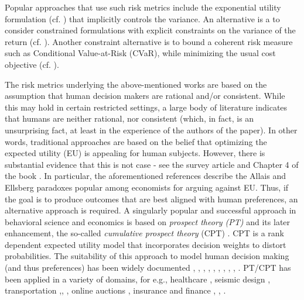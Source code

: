 Popular approaches that use such risk metrics include the exponential utility formulation 
(cf. \cite{borkar2010learning}) that implicitly controls the variance.
An alternative is a to consider constrained formulations 
with explicit constraints on the variance of the return (cf. \cite{tamar2012policy,Prashanth13AC}). 
Another constraint alternative is to bound a coherent risk measure such as Conditional Value-at-Risk (CVaR), 
while minimizing the usual cost objective (cf. \cite{borkar2010risk,prashanth2014policy}).  

The risk metrics underlying the above-mentioned works 
are based on the assumption that human decision makers are rational and/or consistent.
While this may hold in certain restricted settings, a large body of literature indicates that humans are neither rational,
nor consistent (which, in fact, is an unsurprising fact, at least in the experience of the authors of the paper).
In other words, traditional approaches are based on the belief that optimizing the expected utility (EU) is appealing for human subjects. However, there is substantial evidence that this is not case - see 
the survey article \cite{starmer2000developments} and Chapter 4 of the book \cite{quiggin2012generalized}. In particular, the aforementioned references describe the Allais and Ellsberg paradoxes popular among economists for arguing against EU. 
Thus, if the goal is to produce outcomes that are best aligned with human preferences,
an alternative approach is required.
A singularly popular and successful approach in behavioral science and economics
is based on \textit{prospect theory (PT)} \cite{kahneman1979prospect} 
and its later enhancement, the so-called \textit{cumulative prospect theory} (CPT) \cite{tversky1992advances}.
CPT is a rank dependent expected utility model \cite{quiggin2012generalized} that incorporates decision weights to distort probabilities. 
The suitability of this approach to model human decision making (and thus preferences) has been widely documented \cite{prelec1998probability}, \cite{wu1996curvature}, \cite{conlisk1989three}, \cite{camerer1989experimental}, \cite{camerer1992recent}, \cite{harless1992predictions}, \cite{sopher1993test}, \cite{camerer1994violations}, \cite{gonzalez1999shape}, \cite{abdellaoui2000parameter}.
PT/CPT has been applied in a variety of domains, for e.g., healthcare \cite{lenert1999associations},  seismic design \cite{goda2008application}, transportation \cite{gao2010adaptive},\cite{fujii2004drivers}, \cite{ramming2001network}, online auctions \cite{weinberg2005exploring}, insurance  \cite{machina1995non} and finance \cite{barberis1999prospect}, \cite{epstein1989substitution}, \cite{epstein1991substitution}.
\fi

